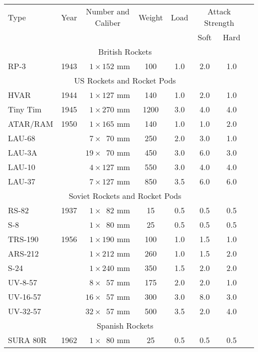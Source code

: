 \begin{twocolumntablefloat}
\begin{twocolumntable}
\begin{tabular}{lrcccccl}
\toprule
Type&
Year&
Number and Caliber&
Weight&
Load&
\multicolumn{2}{c}{Attack Strength}\\
\cmidrule{6-7}
&&&&&Soft&Hard\\
\midrule
\multicolumn{7}{c}{British Rockets}\\
\midrule
RP-3     &1943&$\phantom{0}1 \times \phantom{}152$ mm&\phantom{0}100&1.0&2.0&1.0\\
\midrule
\multicolumn{7}{c}{US Rockets and Rocket Pods}\\
\midrule
HVAR     &1944&$\phantom{0}1 \times \phantom{}127$ mm&\phantom{0}140&1.0&2.0&1.0\\
Tiny Tim &1945&$\phantom{0}1 \times \phantom{}270$ mm&\phantom{}1200&3.0&4.0&4.0\\
ATAR/RAM &1950&$\phantom{0}1 \times \phantom{}165$ mm&\phantom{0}140&1.0&1.0&2.0\\
LAU-68   &    &$\phantom{0}7 \times \phantom{0}70$ mm&\phantom{0}250&2.0&3.0&1.0\\
LAU-3A   &    &$\phantom{}19 \times \phantom{0}70$ mm&\phantom{0}450&3.0&6.0&3.0\\
LAU-10   &    &$\phantom{0}4 \times \phantom{}127$ mm&\phantom{0}550&3.0&4.0&4.0\\
LAU-37   &    &$\phantom{0}7 \times \phantom{}127$ mm&\phantom{0}850&3.5&6.0&6.0\\
\midrule
\multicolumn{7}{c}{Soviet Rockets and Rocket Pods}\\
\midrule
RS-82    &1937&$\phantom{0}1 \times \phantom{0}82$ mm&\phantom{00}15&0.5&0.5&0.5\\
S-8      &    &$\phantom{0}1 \times \phantom{0}80$ mm&\phantom{00}25&0.5&0.5&0.5\\
TRS-190  &1956&$\phantom{0}1 \times \phantom{}190$ mm&\phantom{0}100&1.0&1.5&1.0\\
ARS-212  &    &$\phantom{0}1 \times \phantom{}212$ mm&\phantom{0}260&1.0&1.5&2.0\\
S-24     &    &$\phantom{0}1 \times \phantom{}240$ mm&\phantom{0}350&1.5&2.0&2.0\\
UV-8-57  &    &$\phantom{0}8 \times \phantom{0}57$ mm&\phantom{0}175&2.0&2.0&1.0\\
UV-16-57 &    &$\phantom{}16 \times \phantom{0}57$ mm&\phantom{0}300&3.0&8.0&3.0\\
UV-32-57 &    &$\phantom{}32 \times \phantom{0}57$ mm&\phantom{0}500&3.5&2.0&4.0\\
\midrule
\multicolumn{7}{c}{Spanish Rockets}\\
\midrule
SURA 80R &1962&$\phantom{0}1 \times \phantom{0}80$ mm&\phantom{00}25&0.5&0.5&0.5\\
\bottomrule
\end{tabular}
\end{twocolumntable}
\end{twocolumntablefloat}
